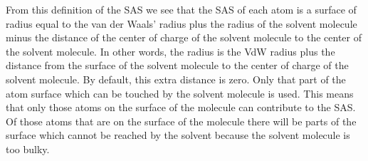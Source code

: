 From this definition of the SAS we see that the SAS of each atom is a  surface
of radius equal to the van der Waals' radius plus the radius of the solvent
molecule minus the distance of the center of charge of the solvent molecule to
the center of the solvent molecule.  In other words, the radius is the VdW
radius plus the distance from the surface of the solvent molecule to the center
of charge of the solvent molecule.  By default, this extra distance is zero.
Only that part of the atom surface which can be touched by the solvent molecule
is used.  This means that only those atoms on the surface of the molecule can
contribute to the SAS.  Of those atoms  that are on the surface of the molecule
there will be parts of the surface which cannot be reached by the solvent
because the solvent molecule is too bulky.
